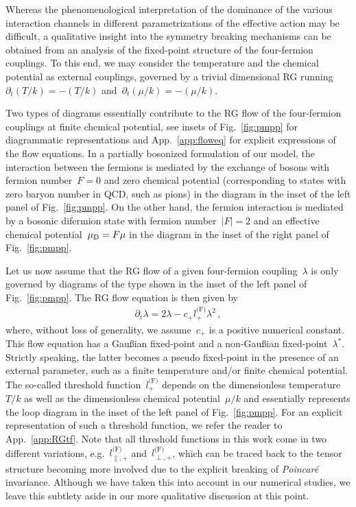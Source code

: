 \documentclass[prd,english,preprintnumbers,amsmath,amssymb,nofootinbib,twocolumn,superscriptaddress]{revtex4-1}
\newcommand{\be}{\begin{eqnarray}}
\newcommand{\ee}{\end{eqnarray}}
\begin{document}
{{Whereas the phenomenological interpretation 
of the dominance of the various interaction channels in different parametrizations
of the effective action may be difficult, a qualitative insight into the symmetry breaking mechanisms
can be obtained from an analysis of the fixed-point structure of the four-fermion couplings. To this end, we may consider
the temperature and the chemical potential as external couplings, governed by a trivial dimensional RG running~$\partial_t (T/k) = -(T/k)$
and~$\partial_t (\mu/k) = -(\mu/k)$.

Two types of diagrams essentially contribute to the RG flow of the four-fermion couplings at finite chemical potential, see insets
of Fig.~\ref{fig:pmpp} for diagrammatic representations and App.~\ref{app:floweq} for explicit expressions of the flow equations. 
In a partially bosonized formulation
of our model, the interaction between the fermions 
is mediated by the exchange of bosons with fermion number~$F=0$ and zero chemical potential 
(corresponding to states with zero baryon number in QCD, such as pions) 
in the diagram in the inset of the left panel of Fig.~\ref{fig:pmpp}. On the other hand,
the fermion interaction is mediated
by a bosonic difermion state with fermion number~$|F|=2$ and an effective chemical potential~$\mu_{\rm D}=F\mu$
in the diagram in the inset of the right panel of Fig.~\ref{fig:pmpp}.

Let us now assume that the RG flow of a given four-fermion coupling~$\lambda$ is only governed by diagrams of
the type shown in the inset of the left panel of Fig.~\ref{fig:pmpp}. The RG flow equation is then given by
%
\be
\partial _t \lambda = 2\lambda - c_{+}l^{\text{(F)}}_{+}\lambda^2\,,
\ee
%
where, without loss of generality, we assume~$c_{+}$ is a positive numerical constant. This flow
equation has a Gau\ss ian fixed-point and a non-Gau\ss ian fixed-point~$\lambda^{\ast}$. Strictly 
speaking, the latter becomes a {pseudo fixed-point in the presence} of an external parameter, such as a
finite temperature and/or finite chemical potential.
The so-called threshold function~$l^{\text{(F)}}_{+}$ depends on the dimensionless
temperature~$T/k$ as well as the dimensionless chemical potential~$\mu/k$ and 
essentially represents the loop diagram in 
the inset of the left panel of Fig.~\ref{fig:pmpp}. For an explicit representation of such a threshold 
function, we refer the reader to App.~\ref{app:RGtf}. Note that all threshold functions in this work come in two different
variations, e.g.~$l^{\text{(F)}}_{\parallel,+}$ and~$l^{\text{(F)}}_{\perp,+}$, which can be traced back to the tensor structure
becoming more involved due to the explicit breaking of {\it Poincar\'{e}} invariance. Although we have taken this into account
in our numerical studies, we leave this subtlety aside in our more qualitative discussion at this point. 

}}
\end{document}
